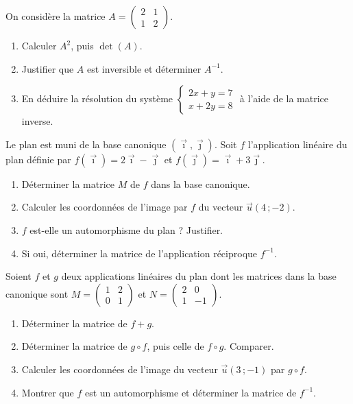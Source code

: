 \documentclass[11pt]{article}
\newcounter{popsec}
\newcounter{popsub}
\newcommand{\courssub}[1]{%
  \stepcounter{popsub}%
  \par\vspace{9pt}\noindent{\popxbold\fontsize{11.5}{13}\selectfont\color{popink}{\color{poporange}\thepopsec.\thepopsub}\hspace{6pt}#1}\par\nopagebreak\vspace{4pt}
}
\begin{document}
\courssub{Je m'entraîne}

\begin{exercice}
On considère la matrice $A=\begin{pmatrix} 2 & 1 \\ 1 & 2 \end{pmatrix}$.
\begin{enumerate}
\item Calculer $A^2$, puis $\det(A)$.
\item Justifier que $A$ est inversible et déterminer $A^{-1}$.
\item En déduire la résolution du système $\begin{cases} 2x+y=7 \\ x+2y=8 \end{cases}$ à l'aide de la matrice inverse.
\end{enumerate}
\end{exercice}

\begin{exercice}
Le plan est muni de la base canonique $(\vec{\imath},\vec{\jmath})$. Soit $f$ l'application linéaire du plan définie par
$f(\vec{\imath})=2\vec{\imath}-\vec{\jmath}$ et $f(\vec{\jmath})=\vec{\imath}+3\vec{\jmath}$.
\begin{enumerate}
\item Déterminer la matrice $M$ de $f$ dans la base canonique.
\item Calculer les coordonnées de l'image par $f$ du vecteur $\vec{u}(4\,;-2)$.
\item $f$ est-elle un automorphisme du plan ? Justifier.
\item Si oui, déterminer la matrice de l'application réciproque $f^{-1}$.
\end{enumerate}
\end{exercice}

\begin{exercice}
Soient $f$ et $g$ deux applications linéaires du plan dont les matrices dans la base canonique sont
$M=\begin{pmatrix} 1 & 2 \\ 0 & 1 \end{pmatrix}$ et $N=\begin{pmatrix} 2 & 0 \\ 1 & -1 \end{pmatrix}$.
\begin{enumerate}
\item Déterminer la matrice de $f+g$.
\item Déterminer la matrice de $g\circ f$, puis celle de $f\circ g$. Comparer.
\item Calculer les coordonnées de l'image du vecteur $\vec{u}(3\,;-1)$ par $g\circ f$.
\item Montrer que $f$ est un automorphisme et déterminer la matrice de $f^{-1}$.
\end{enumerate}
\end{exercice}
\end{document}

